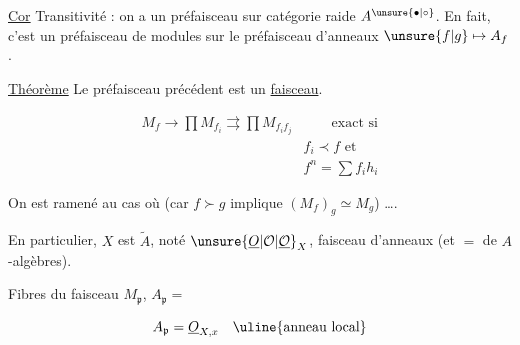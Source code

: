 
\uline{Cor} Transitivité : on a un préfaisceau  sur  catégorie  raide $A^{\unsure{\bullet|\circ}}$. En fait, c'est un préfaisceau de modules sur le préfaisceau d'anneaux $\unsure{f|g}\mapsto A_f$.

\uline{Théorème} Le préfaisceau précédent est un \uline{faisceau}.

\[
\begin{aligned}
M_f\longrightarrow\prod M_{f_i}\rightrightarrows\prod M_{f_i f_j}
&\qquad\text{exact si}\\
& f_i\prec f\text{ et}\\
& f^n=\sum f_i h_i
\end{aligned}
\]


On est ramené au cas où   (car  $f\succ g$ implique $(M_f)_g\simeq M_g$) \ldots.

En particulier, $X$ est  $\widetilde A$, noté $\unsure{\underline O|\mathcal O|\underline{\mathcal O}}_X$, faisceau  d'anneaux (et $=$ de $A$-algèbres).

Fibres du faisceau $M_{\mathfrak p}$, $A_{\mathfrak p}=$

\[
A_{\mathfrak p}=\underline O_{X,x}\quad\text{\uline{anneau local}}
\]

\margin{[$S\subset A$ stable par multiplication donc filtrant pour \deleted{\unsure{\prec}} $\succ$ donc $MS^{-1}=\varinjlim_{f\in S}M_f=\{\frac{x}{f^n}$ \unsure{avec} règles de calcul \ldots.]}


